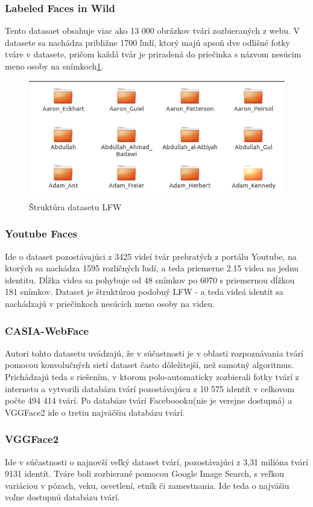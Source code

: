 \subsubsection{Labeled Faces in Wild}
Tento datasaet obsahuje viac ako 13 000 obrázkov tvárí zozbieraných z webu.
V datasete sa nachádza približne 1700 ľudí, ktorý majú apsoň dve odlišné fotky tváre v datasete,
pričom každá tvár je priradená do priečinka s názvom nesúcim meno osoby na snímkoch\ref{fig:lfwf}.\cite{LFWTech}

\begin{figure}[H]
	\centering
	\includegraphics[width=0.5\linewidth]{img/lfwf}
	\caption{Štruktúra datasetu LFW}
	\label{fig:lfwf}
\end{figure}

\subsubsection{Youtube Faces}
Ide o dataset pozostávajúci z 3425 videí tvár prebratých z portálu Youtube, na ktorých sa nachádza 1595 rozličných ľudí, a teda priemerne 2.15 videa na jednu identitu.
Dĺžka videa sa pohybuje od 48 snímkov po 6070 s priemernou dĺžkou 181 snímkov.
Dataset je štruktúrou podobný LFW - a teda videá identít sa nachádzajú v priečinkoch nesúcich meno osoby na videu.\cite{wolf2011face}

\subsubsection{CASIA-WebFace}
Autori tohto datasetu uvádzajú, že v súčastnosti je v oblasti rozpoznávania tvárí pomocou konvolučných sietí dataset často dôležitejší, než samotný algoritmus\cite{Centerfo}.
Prichádzajú teda s riešením, v ktorom polo-automaticky zozbierali fotky tvárí z internetu a vytvorili databázu tvárí pozostávajúcu z 10 575 identít v celkovom počte 494 414 tvárí.
Po databáze tvárí Faceboooku(nie je verejne dostupná) a VGGFace2 ide o tretiu najväčšiu databázu tvárí.
\subsubsection{VGGFace2}
Ide v súčastnosti o najnovší veľký dataset tvárí, pozostávajúci z 3,31 milióna tvárí 9131 identít.
Tváre boli zozbierané pomocou Google Image Search, s veľkou variáciou v pózach, veku, osvetlení, etník či zamestnania.\cite{cao2017vggface2}
Ide teda o najväšiu voľne dostupnú databázu tvárí.

